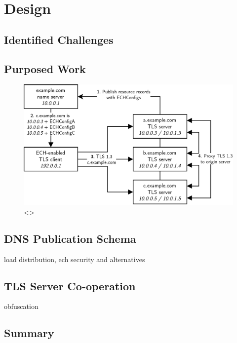 \chapter{Design}\label{Design}

\blindtext









\section{Identified Challenges}

\blindtext









\section{Purposed Work}

\blindtext

\begin{figure}[ht]
\centerline{\includegraphics[width=160mm]{images/distributed-ech.png}}
\caption[Example distributed ECH deployment]{<>}
\label{distributed_ech_figure}
\end{figure}










\section{DNS Publication Schema}

load distribution, ech security and alternatives
\blindtext










\section{TLS Server Co-operation}

obfuscation
\blindtext










\section{Summary}

\blindtext
